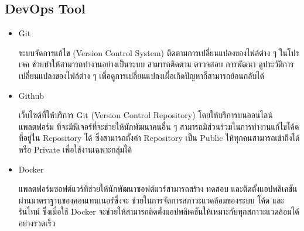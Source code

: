 \documentclass[12pt,oneside,openright,a4paper]{cpe-thai-project}
\begin{document}
  \subsection{DevOps Tool}
    \begin{itemize}
      \item Git
      
      \hspace{1cm}ระบบจัดการแก้ไข (Version Control System) ติดตามการเปลี่ยนแปลงของไฟล์ต่าง ๆ ในโปรเจค ช่วยทำให้สามารถทำงานอย่างเป็นระบบ 
      สามารถติดตาม ตรวจสอบ การพัฒนา ดูประวัติการเปลี่ยนแปลงของไฟล์ต่าง ๆ เพื่อดูการเปลี่ยนแปลงเผื่อเกิดปัญหาก็สามารถย้อนกลับได้ \cite{git}

      \item Github
      
      \hspace{1cm}เว็บไซต์ที่ให้บริการ Git (Version Control Repository) โดยให้บริการบนออนไลน์แพลตฟอร์ม 
      ที่จะมีฟีเจอร์ที่จะช่วยให้นักพัฒนาคนอื่น ๆ สามารถมีส่วนร่วมในการทำงานแก้ไขโค้ดที่อยู่ใน Repository ได้
      ซึ่งสามารถตั้งค่า Repository เป็น Public ให้ทุกคนสามารถเข้าถึงได้ หรือ Private เพื่อใช้งานเฉพาะกลุ่มได้ \cite{github}

      \item Docker
      
      \hspace{1cm}แพลตฟอร์มซอฟต์แวร์ที่ช่วยให้นักพัฒนาซอฟต์แวร์สามารถสร้าง ทดสอบ และติดตั้งแอปพลิเคชันผ่านมาตราฐานของคอนเทนเนอร์ซึ่งจะ
      ช่วยในการจัดการสภาวะแวดล้อมของระบบ โค้ด และรันไทม์ ซึ่งเมื่อใช้ Docker จะช่วยให้สามารถติดตั้งแอปพลิเคชันให้เหมาะกับทุกสภาวะแวดล้อมได้อย่างรวดเร็ว \cite{docker} 
    \end{itemize}
  
\end{document}
